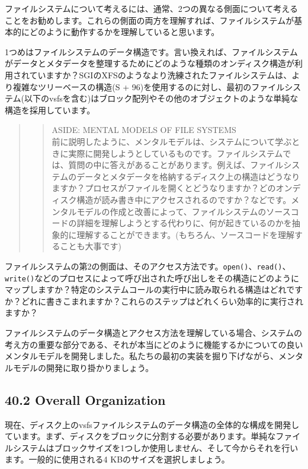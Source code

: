 ファイルシステムについて考えるには、通常、2つの異なる側面について考えることをお勧めします。これらの側面の両方を理解すれば、ファイルシステムが基本的にどのように動作するかを理解していると思います。

1つめはファイルシステムのデータ構造です。言い換えれば、ファイルシステムがデータとメタデータを整理するためにどのような種類のオンディスク構造が利用されていますか？SGIのXFSのようなより洗練されたファイルシステムは、より複雑なツリーベースの構造(S
+
96)を使用するのに対し、最初のファイルシステム(以下のvsfsを含む)はブロック配列やその他のオブジェクトのような単純な構造を採用しています。

\begin{quote}
\begin{quote}
ASIDE: MENTAL MODELS OF FILE SYSTEMS\\
前に説明したように、メンタルモデルは、システムについて学ぶときに実際に開発しようとしているものです。ファイルシステムでは、質問の中に答えがあることがあります。例えば、ファイルシステムのデータとメタデータを格納するディスク上の構造はどうなりますか？プロセスがファイルを開くとどうなりますか？どのオンディスク構造が読み書き中にアクセスされるのですか？などです。メンタルモデルの作成と改善によって、ファイルシステムのソースコードの詳細を理解しようとする代わりに、何が起きているのかを抽象的に理解することができます。(もちろん、ソースコードを理解することも大事です)
\end{quote}
\end{quote}

ファイルシステムの第2の側面は、そのアクセス方法です。\texttt{open()}、\texttt{read()}、\texttt{write()}などのプロセスによって呼び出された呼び出しをその構造にどのようにマップしますか？特定のシステムコールの実行中に読み取られる構造はどれですか？どれに書きこまれますか？これらのステップはどれくらい効率的に実行されますか？

ファイルシステムのデータ構造とアクセス方法を理解している場合、システムの考え方の重要な部分である、それが本当にどのように機能するかについての良いメンタルモデルを開発しました。私たちの最初の実装を掘り下げながら、メンタルモデルの開発に取り掛かりましょう。

\hypertarget{overall-organization}{%
\subsection*{40.2 Overall Organization}\label{overall-organization}}

現在、ディスク上のvsfsファイルシステムのデータ構造の全体的な構成を開発しています。まず、ディスクをブロックに分割する必要があります。単純なファイルシステムはブロックサイズを1つしか使用しません、そして今からそれを行います。一般的に使用される4
KBのサイズを選択しましょう。

